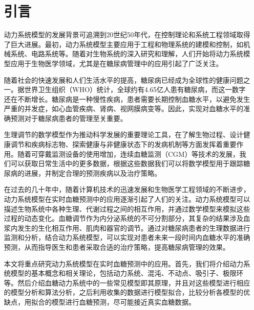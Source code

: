 \chapter{引言}\label{chap:introduction}
动力系统模型的发展背景可追溯到20世纪50年代，在控制理论和系统工程领域取得了巨大进展。最初，动力系统模型主要应用于工程和物理系统的建模和控制，如机械系统、电路系统等\cite{hargrove1998dynamic}。随着对生物系统的深入研究和理解，人们开始将动力系统模型应用于生物医学领域，尤其是在糖尿病管理中的应用引起了广泛关注\cite{ellner2006dynamic}。

随着社会的快速发展和人们生活水平的提高，糖尿病已经成为全球性的健康问题之一。据世界卫生组织（WHO）统计，全球约有4.65亿人患有糖尿病，而这一数字还在不断增长\cite{zimmet2016diabetes}。糖尿病是一种慢性疾病，患者需要长期控制血糖水平，以避免发生严重的并发症，如心血管疾病、肾病、视网膜病变等\cite{zheng2018global}。因此，实现对血糖水平的准确预测对于糖尿病患者的管理至关重要。

生理调节的数学模型作为推动科学发展的重要理论工具，在了解生物过程、设计健康调节和疾病标志物、探索健康与非健康状态下的发病机制等方面发挥着重要作用\cite{bakhti2019modelling}。随着可穿戴监测设备的使用增加\cite{kim2020wearable}，连续血糖监测（CGM）等技术的发展，我们可以获取日常生活中的更多数据，根据这些数据我们可以将数学模型用于跟踪糖尿病的进展\cite{ha2020type}，并制定合理的预测疾病以及治疗策略。

在过去的几十年中，随着计算机技术的迅速发展和生物医学工程领域的不断进步，动力系统模型在实时血糖预测中的应用逐渐引起了人们的关注。动力系统模型可以描述生物系统中各种生理、代谢过程之间的相互作用，并通过数学模型来模拟这些过程的动态变化\cite{cobelli2009diabetes}。血糖调节作为内分泌系统的不可分割部分，其复杂的结果涉及血浆内发生的生化相互作用、肌肉和器官的调节\cite{zavala2019mathematical}。通过对糖尿病患者的生理数据进行监测和分析，结合动力系统模型，可以实现对患者未来一段时间内血糖水平的准确预测，从而指导医生和患者采取合适的治疗策略，提高糖尿病管理的效果。

本文将重点研究动力系统模型在实时血糖预测中的应用。首先，我们将介绍动力系统模型的基本概念和相关理论，包括动力系统、混沌、不动点、吸引子、极限环等。然后介绍血糖动力系统中的一些常见模型即其原理，并且对这些模型进行相应的模型分析和算法分析，之后利用收集的数据进行模型拟合，比较分析各模型的优缺点，用拟合的模型进行血糖预测，尽可能接近真实血糖数据。